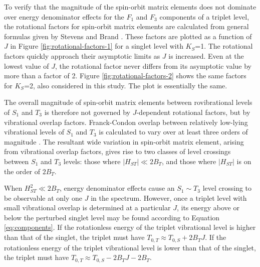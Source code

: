 To verify that the magnitude of the spin-orbit matrix elements does
not dominate over energy denominator effects for the $F_1$ and $F_3$
components of a triplet level, the rotational factors for spin-orbit
matrix elements are calculated from general formulas given by Stevens
and Brand \cite{stevens73}.  These factors are plotted as a function
of $J$ in Figure \ref{fig:rotational-factors-1} for a singlet level
with $K_S$=1.  The rotational factors quickly approach their
asymptotic limits as $J$ is increased.  Even at the lowest value of
$J$, the rotational factor never differs from its asymptotic value by
more than a factor of 2.  Figure \ref{fig:rotational-factors-2} shows
the same factors for $K_S$=2, also considered in this study.  The plot
is essentially the same.

The overall magnitude of spin-orbit matrix elements between
rovibrational levels of $S_1$ and $T_3$ is therefore not governed by
$J$-dependent rotational factors, but by vibrational overlap factors.
Franck-Condon overlap between relatively low-lying vibrational levels
of $S_1$ and $T_3$ is calculated to vary over at least three orders of
magnitude \cite{thom07}.  The resultant wide variation in spin-orbit
matrix element, arising from vibrational overlap factors, gives rise
to two classes of level crossings between $S_1$ and $T_3$ levels:
those where $\lvert H_{ST} \rvert \ll 2B_T$, and those where $\lvert
H_{ST} \rvert$ is on the order of $2B_T$.

When $H_{ST}^2 \ll 2B_T$, energy denominator effects cause an $S_1
\sim T_3$ level crossing to be observable at only one $J$ in the
spectrum.  However, once a triplet level with small vibrational
overlap is determined at a particular $J$, its energy above or below the
perturbed singlet level may be found according to Equation
\ref{eq:components}.  If the rotationless energy of the triplet
vibrational level is higher than that of the singlet, the triplet must
have $T_{0,T} \approx T_{0,S} + 2B_TJ$.  If the rotationless energy of
the triplet vibrational level is lower than that of the singlet, the
triplet must have $T_{0,T} \approx T_{0,S} - 2B_TJ - 2B_T$.

